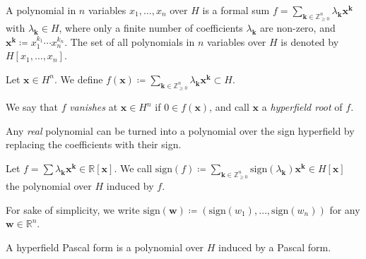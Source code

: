 \begin{definition}
    A polynomial in \( n \) variables \( x_1, \dots, x_n \) over \( H \) is a formal sum \( f= \sum_{\mathbf{k} \in \mathbb{Z}^n_{\geq 0}} \lambda_{\mathbf{k}} \mathbf{x}^{\mathbf{k}} \) with \( \lambda_{\mathbf{k}} \in H \),
    where only a finite number of coefficients \( \lambda_{\mathbf{k}} \) are non-zero, and \( \mathbf{x}^{\mathbf{k}} \coloneqq x_1^{k_1} \cdots x_n^{k_n} \). The set of all polynomials in \( n \) variables over \( H \) is denoted by \( H[x_1, \dots, x_n] \).
\end{definition}

\begin{definition}
    Let \( \mathbf{x} \in H^n \). We define \( f(\mathbf{x}) \coloneqq \sum_{\mathbf{k} \in \mathbb{Z}^n_{\geq 0}} \lambda_{\mathbf{k}} \mathbf{x}^{\mathbf{k}} \subset H \).
\end{definition}

\begin{definition}
    We say that \( f \) \emph{vanishes} at \( \mathbf{x} \in H^n \) if \( 0 \in f(\mathbf{x}) \), and call \( \mathbf{x} \) a \emph{hyperfield root} of \( f \).
\end{definition}


Any \emph{real} polynomial can be turned into a polynomial over the sign hyperfield by replacing the coefficients with their sign.

\begin{definition}
    Let \( f = \sum \lambda_{\mathbf{k}} \mathbf{x}^{\mathbf{k}} \in \mathbb{R}[\mathbf{x}] \). We call \( \mathrm{sign}(f) \coloneqq \sum_{\mathbf{k} \in \mathbb{Z}^n_{\geq 0}} \mathrm{sign}(\lambda_{\mathbf{k}}) \mathbf{x}^{\mathbf{k}} \in H[\mathbf{x}] \)
    the polynomial over \( H \) induced by \( f \).
\end{definition}

For sake of simplicity, we write \(  \mathrm{sign}(\mathbf{w}) \coloneqq (\mathrm{sign}(w_1), \dots, \mathrm{sign}(w_n)) \) for any \( \mathbf{w} \in \mathbb{R}^n \).

\begin{definition}
    A hyperfield Pascal form is a polynomial over \( H \) induced by a Pascal form.
\end{definition}


